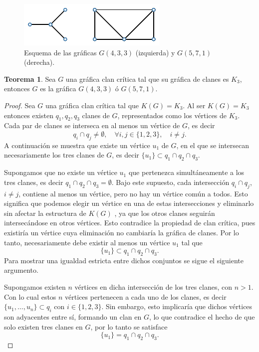 \documentclass[12pt]{book}
\theoremstyle{definition}
\newtheorem{theorem}{Teorema}[chapter]
\begin{document}
\begin{figure}[!htbp]
	\centering
	\includegraphics[scale=1.2]{Fig0.pdf}
	\caption{Esquema de las gráficas $G(4,3,3)$ (izquierda) y $G(5,7,1)$ (derecha).\label{F1}}
\end{figure}

\begin{theorem}
	Sea $G$ una gráfica clan crítica tal que su gráfica de clanes es $K_3$, entonces $G$ es la gráfica $G(4,3,3)$ ó $G(5,7,1)$.
\end{theorem}
\begin{proof}
Sea $G$ una gráfica clan crítica tal que $K(G)=K_3$. Al ser $K(G)=K_3$ entonces existen $q_1,q_2,q_3$ clanes de $G$, representados como los vértices de $K_3$. Cada par de clanes se interseca en al menos un vértice de $G$, es decir
\begin{equation*}
q_i\cap q_j\neq \emptyset, \quad \forall i,j\in\{1,2,3\},\quad i\neq j.
\end{equation*}
A continuación se muestra que existe un vértice $u_1$ de $G$, en el que se intersecan necesariamente los tres clanes de $G$, es decir $\{u_1\}\subset q_1\cap q_2 \cap q_3$. 

Supongamos que no existe un vértice $u_1$ que pertenezca simultáneamente a los tres clanes, es decir  $q_1\cap q_2 \cap q_3=\emptyset$. Bajo este supuesto, cada intersección $q_i\cap q_j$, $i\neq j$, contiene al menos un vértice, pero no hay un vértice común a todos. Esto significa que podemos elegir un vértice en una de estas intersecciones y eliminarlo sin afectar la estructura de $K(G)$ , ya que los otros clanes seguirán intersecándose en otros vértices. Esto contradice la propiedad de clan crítica, pues existiría un vértice cuya eliminación no cambiaría la gráfica de clanes.
Por lo tanto, necesariamente debe existir al menos un vértice $u_1$ tal que
\begin{equation*}
\{u_1\}\subset q_1\cap q_2 \cap q_3.
\end{equation*}
Para mostrar una igualdad estricta entre dichos conjuntos se sigue el siguiente argumento.

Supongamos existen $n$ vértices en dicha intersección de los tres clanes, con $n>1$. Con lo cual estos $n$ vértices pertenecen a cada uno de los clanes, es decir $\{u_1, \dots , u_n\} \subset q_i$ con $i\in\{1,2,3\}$. Sin embargo, esto implicaría que dichos vértices son adyacentes entre sí, formando un clan en $G$, lo que contradice el hecho de que solo existen tres clanes en $G$, por lo tanto se satisface 
\begin{equation*}
	\{u_1\}=q_1\cap q_2 \cap q_3.
\end{equation*}


\end{proof}
\end{document}
